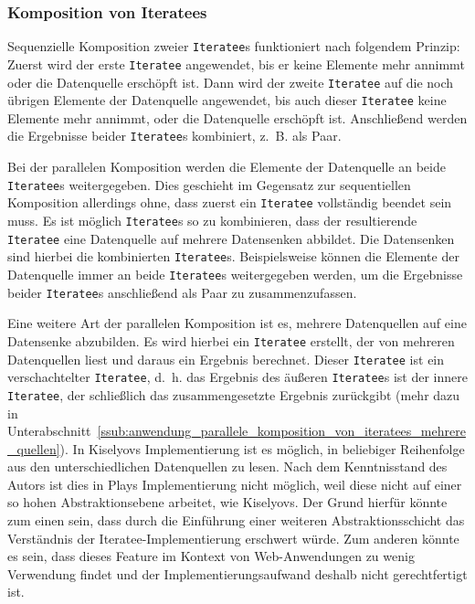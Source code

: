 \subsubsection{Komposition von Iteratees} %
\label{ssub:komposition_von_iteratees}

Sequenzielle Komposition zweier \lstinline|Iteratee|s funktioniert nach folgendem Prinzip:
Zuerst wird der erste \lstinline|Iteratee| angewendet, bis er keine Elemente mehr annimmt oder die Datenquelle erschöpft ist.
Dann wird der zweite \lstinline|Iteratee| auf die noch übrigen Elemente der Datenquelle angewendet, bis auch dieser \lstinline|Iteratee| keine Elemente mehr annimmt, oder die Datenquelle erschöpft ist.
Anschließend werden die Ergebnisse beider \lstinline|Iteratee|s kombiniert, z.~B. als Paar. %

Bei der parallelen Komposition werden die Elemente der Datenquelle an beide \lstinline|Iteratee|s weitergegeben.
Dies geschieht im Gegensatz zur sequentiellen Komposition allerdings ohne, dass zuerst ein \lstinline|Iteratee| vollständig beendet sein muss.
Es ist möglich \lstinline|Iteratee|s so zu kombinieren, dass der resultierende \lstinline|Iteratee| eine Datenquelle auf mehrere Datensenken abbildet.
Die Datensenken sind hierbei die kombinierten \lstinline|Iteratee|s.
Beispielsweise können die Elemente der Datenquelle immer an beide \lstinline|Iteratee|s weitergegeben werden, um die Ergebnisse beider \lstinline|Iteratee|s anschließend als Paar zu zusammenzufassen. %

Eine weitere Art der parallelen Komposition ist es, mehrere Datenquellen auf eine Datensenke abzubilden.
Es wird hierbei ein \lstinline|Iteratee| erstellt, der von mehreren Datenquellen liest und daraus ein Ergebnis berechnet.
Dieser \lstinline|Iteratee| ist ein verschachtelter \lstinline|Iteratee|, d.~h. das Ergebnis des äußeren \lstinline|Iteratee|s ist der innere \lstinline|Iteratee|, der schließlich das zusammengesetzte Ergebnis zurückgibt (mehr dazu in Unterabschnitt~\ref{ssub:anwendung_parallele_komposition_von_iteratees_mehrere_quellen}).
In Kiselyovs Implementierung ist es möglich, in beliebiger Reihenfolge aus den unterschiedlichen Datenquellen zu lesen.
Nach dem Kenntnisstand des Autors ist dies in Plays Implementierung nicht möglich, weil diese nicht auf einer so hohen Abstraktionsebene arbeitet, wie Kiselyovs.
Der Grund hierfür könnte zum einen sein, dass durch die Einführung einer weiteren Abstraktionsschicht das Verständnis der Iteratee-Implementierung erschwert würde.
Zum anderen könnte es sein, dass dieses Feature im Kontext von Web-Anwendungen zu wenig Verwendung findet und der Implementierungsaufwand deshalb nicht gerechtfertigt ist.

